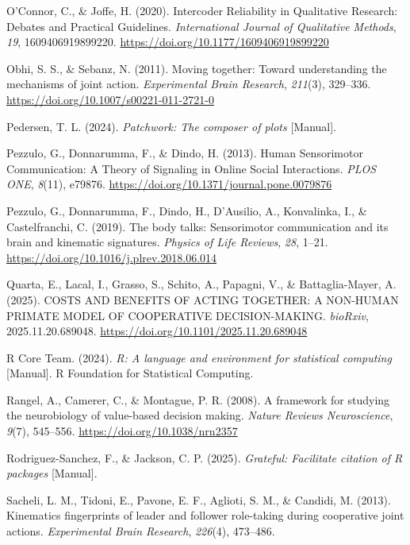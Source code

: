 \documentclass[
  11pt,
  letterpaper,
]{article}
\newlength{\cslhangindent}
\newenvironment{CSLReferences}[2] %
 {\begin{list}{}{%
  \setlength{\itemindent}{0pt}
  \setlength{\leftmargin}{0pt}
  \setlength{\parsep}{0pt}
  \ifodd #1
   \setlength{\leftmargin}{\cslhangindent}
   \setlength{\itemindent}{-1\cslhangindent}
  \fi
  \setlength{\itemsep}{#2\baselineskip}}}
 {\end{list}}
\renewcommand{\emph}[1]{\textit{#1}}  %
\begin{document}
\begin{CSLReferences}{1}{0}
O'Connor, C., \& Joffe, H. (2020). Intercoder {Reliability} in
{Qualitative Research}: {Debates} and {Practical Guidelines}.
\emph{International Journal of Qualitative Methods}, \emph{19},
1609406919899220. \url{https://doi.org/10.1177/1609406919899220}

Obhi, S. S., \& Sebanz, N. (2011). Moving together: Toward understanding
the mechanisms of joint action. \emph{Experimental Brain Research},
\emph{211}(3), 329--336. \url{https://doi.org/10.1007/s00221-011-2721-0}

Pedersen, T. L. (2024). \emph{Patchwork: {The} composer of plots}
{[}Manual{]}.

Pezzulo, G., Donnarumma, F., \& Dindo, H. (2013). Human {Sensorimotor
Communication}: {A Theory} of {Signaling} in {Online Social
Interactions}. \emph{PLOS ONE}, \emph{8}(11), e79876.
\url{https://doi.org/10.1371/journal.pone.0079876}

Pezzulo, G., Donnarumma, F., Dindo, H., D'Ausilio, A., Konvalinka, I.,
\& Castelfranchi, C. (2019). The body talks: {Sensorimotor}
communication and its brain and kinematic signatures. \emph{Physics of
Life Reviews}, \emph{28}, 1--21.
\url{https://doi.org/10.1016/j.plrev.2018.06.014}

Quarta, E., Lacal, I., Grasso, S., Schito, A., Papagni, V., \&
Battaglia-Mayer, A. (2025). {COSTS AND BENEFITS OF ACTING TOGETHER}: {A
NON-HUMAN PRIMATE MODEL OF COOPERATIVE DECISION-MAKING}. \emph{bioRxiv},
2025.11.20.689048. \url{https://doi.org/10.1101/2025.11.20.689048}

R Core Team. (2024). \emph{R: A language and environment for statistical
computing} {[}Manual{]}. R Foundation for Statistical Computing.

Rangel, A., Camerer, C., \& Montague, P. R. (2008). A framework for
studying the neurobiology of value-based decision making. \emph{Nature
Reviews Neuroscience}, \emph{9}(7), 545--556.
\url{https://doi.org/10.1038/nrn2357}

Rodriguez-Sanchez, F., \& Jackson, C. P. (2025). \emph{Grateful:
{Facilitate} citation of {R} packages} {[}Manual{]}.

Sacheli, L. M., Tidoni, E., Pavone, E. F., Aglioti, S. M., \& Candidi,
M. (2013). Kinematics fingerprints of leader and follower role-taking
during cooperative joint actions. \emph{Experimental Brain Research},
\emph{226}(4), 473--486.


\end{CSLReferences}
\end{document}
